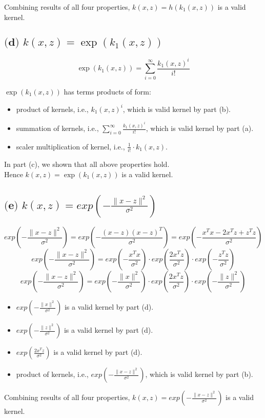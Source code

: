\documentclass[12pt]{article}
\begin{document}
Combining results of all four properties, $k(x, z) = h(k_1(x, z))$ is a valid kernel.

\subsection*{$ \textbf{(d) } k(x, z) = \exp(k_1(x, z))$}
$$ \exp(k_1(x, z)) = \sum_{i=0}^{\infty} \frac{k_1(x, z)^i}{i!} $$

$ \exp(k_1(x, z)) $ has terms products of form:
\begin{itemize}
    \item product of kernels, i.e., $k_1(x, z)^i$, which is valid kernel by part (b).
    \item summation of kernels, i.e., $\sum_{i=0}^{\infty} \frac{k_1(x, z)^i}{i!}$, which is valid kernel by part (a).
    \item scaler multiplication of kernel, i.e., $\frac{1}{i!} \cdot k_1(x, z)$.
\end{itemize}
In part (c), we shown that all above properties hold. \\
Hence $k(x, z) = \exp(k_1(x, z))$ is a valid kernel.

\subsection*{$ \textbf{(e) } k(x, z) = exp(-\frac{\|x-z\|^2}{\sigma^2})$}
$$ exp(-\frac{\|x-z\|^2}{\sigma^2}) = exp(-\frac{(x-z)(x-z)^T}{\sigma^2}) = exp(-\frac{x^Tx - 2x^Tz + z^Tz}{\sigma^2}) $$
$$ exp(-\frac{\|x-z\|^2}{\sigma^2}) = exp(-\frac{x^Tx}{\sigma^2}) \cdot exp(\frac{2x^Tz}{\sigma^2}) \cdot exp(-\frac{z^Tz}{\sigma^2}) $$
$$ exp(-\frac{\|x-z\|^2}{\sigma^2}) = exp(-\frac{\|x\|^2}{\sigma^2}) \cdot exp(\frac{2x^Tz}{\sigma^2}) \cdot exp(-\frac{\|z\|^2}{\sigma^2}) $$

\begin{itemize}
    \item $exp(-\frac{\|x\|^2}{\sigma^2})$ is a valid kernel by part (d).
    \item $exp(-\frac{\|z\|^2}{\sigma^2})$ is a valid kernel by part (d).
    \item $exp(\frac{2x^Tz}{\sigma^2})$ is a valid kernel by part (d).
    \item product of kernels, i.e., $exp(-\frac{\|x-z\|^2}{\sigma^2})$, which is valid kernel by part (b).
\end{itemize}

Combining results of all four properties, $k(x, z) = exp(-\frac{\|x-z\|^2}{\sigma^2})$ is a valid kernel.
\end{document}
